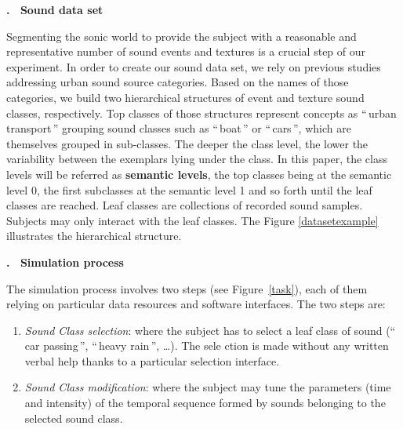 \documentclass[12pt, titlepage, reqno]{article} %
\renewcommand{\subsection}[1]{\medskip \addtocounter{subsection}{1}\raggedright
    \textbf{\Alph{subsection}. \ #1} \medskip \setcounter{subsubsection}{0}\setlength{\parindent}{5ex}
}
\begin{document}
\subsection{Sound data set}
\label{subsection:Sound dataset}

Segmenting the sonic world to provide the subject with a reasonable and representative number of sound events and textures is a crucial step of our experiment. In order to create our sound data set, we rely on previous studies addressing urban sound source categories\cite{maffiolo_caracterisation_1999, dubois2006cognitive,guastavino_categorization_2007, guastavino_ideal_2006, niessen_categories_2010, brown_towards_2011}. Based on the names of those categories, we build two hierarchical structures of event and texture sound classes,  respectively. Top classes of those structures represent concepts as ``\,urban transport\,'' grouping  sound classes such as ``\,boat\,'' or  ``\,cars\,'', which are themselves grouped in sub-classes. The deeper the class level, the lower the variability between the exemplars lying under the class. In this paper, the class levels will be referred as \textbf{semantic levels}, the top classes being at the semantic level 0, the first subclasses at the semantic level 1 and so forth until the leaf classes are reached. Leaf classes are collections of recorded sound samples. Subjects may only interact with the leaf classes. The Figure \ref{datasetexample} illustrates the hierarchical structure.

\subsection{Simulation process}
The simulation process involves two steps (see Figure~\ref{task}), each of them relying on particular data resources and software interfaces. The two steps are: 

\begin{enumerate}
\item \textit{Sound Class selection}: where the subject has to select a leaf class of sound (``\,car passing\,'', ``\,heavy rain\,'', \ldots{}).  The sele	ction is made without any written verbal help thanks to a particular selection interface.
\item \textit{Sound Class modification}: where the subject may tune the parameters (time and intensity) of the temporal sequence formed by sounds belonging to the selected sound class.
\end{enumerate}
 
\end{document}
